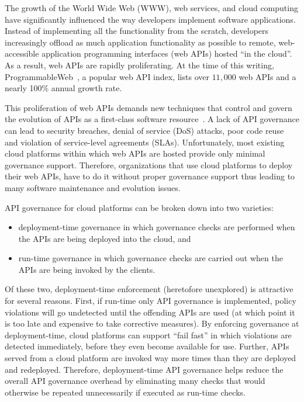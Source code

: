 The growth of the World Wide Web (WWW), web services, and cloud computing have
significantly influenced the way developers implement software applications.
Instead of implementing all the functionality from the scratch, developers
increasingly offload as much application functionality as possible to remote,
web-accessible application programming interfaces (web APIs) hosted ``in the
cloud''. As a result, web APIs are rapidly proliferating.
At the time of this writing, 
ProgrammableWeb~\cite{pweb}, a popular web API index, lists over $11,000$
web APIs and a nearly 100\% annual growth rate. 

This proliferation of web APIs demands new techniques that
control and govern the evolution of APIs as a first-class software
resource~\cite{6903538}. A lack of API governance can lead to 
security breaches, denial of service (DoS)
attacks, poor code reuse and violation of service-level agreements (SLAs). 
Unfortunately, most existing cloud platforms
within which web APIs are hosted provide only minimal governance support.
Therefore, organizations that use cloud platforms to deploy their web APIs, have to
do it without proper governance support thus leading to many software maintenance
and evolution issues.

API governance for cloud platforms can be broken down into two varieties:
\begin{itemize}
\item deployment-time governance in which governance checks are performed 
when the APIs are being deployed into the cloud, and
\item run-time governance in which governance checks are carried out when the APIs
are being invoked by the clients.
\end{itemize}
Of these two, 
deployment-time enforcement (heretofore unexplored) is attractive for several
reasons.  First, if run-time only API governance is implemented, 
policy violations will go undetected until the offending APIs are used (at which
point it is too late and expensive to take corrective measures).  
By enforcing governance at deployment-time,
cloud platforms can support ``fail fast'' in which violations are detected
immediately, before they even become available for use. Further, APIs served from a cloud
platform are invoked way more times than they are deployed and redeployed. 
Therefore, deployment-time API governance helps reduce the overall API governance
overhead by eliminating many checks that would otherwise be repeated unnecessarily
if executed as run-time checks.

